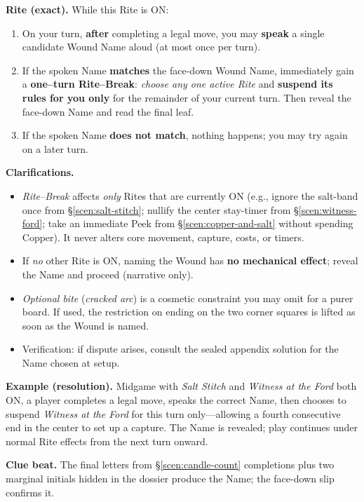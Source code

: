 \documentclass[11pt]{article}
\numberwithin{equation}{section} %
\theoremstyle{plain} %
\theoremstyle{definition} %
\theoremstyle{remark} %
\begin{document}
\medskip
\noindent\textbf{Rite (exact).} While this Rite is \textsc{ON}:
\begin{enumerate}\setlength\itemsep{0.2em}
  \item On your turn, \textbf{after} completing a legal move, you may \textbf{speak} a single candidate Wound Name aloud (at most once per turn).
  \item If the spoken Name \textbf{matches} the face-down Wound Name, immediately gain a \textbf{one–turn Rite–Break}: \emph{choose any one active Rite} and \textbf{suspend its rules for you only} for the remainder of your current turn. Then reveal the face-down Name and read the final leaf.
  \item If the spoken Name \textbf{does not match}, nothing happens; you may try again on a later turn.
\end{enumerate}

\medskip
\noindent\textbf{Clarifications.}
\begin{itemize}\setlength\itemsep{0.25em}
  \item \textit{Rite–Break} affects \emph{only} Rites that are currently \textsc{ON} (e.g., ignore the salt-band once from \S\ref{scen:salt-stitch}; nullify the center stay-timer from \S\ref{scen:witness-ford}; take an immediate Peek from \S\ref{scen:copper-and-salt} without spending Copper). It never alters core movement, capture, costs, or timers.
  \item If \emph{no} other Rite is \textsc{ON}, naming the Wound has \textbf{no mechanical effect}; reveal the Name and proceed (narrative only).
  \item \textit{Optional bite} (\emph{cracked arc}) is a cosmetic constraint you may omit for a purer board. If used, the restriction on ending on the two corner squares is lifted as soon as the Wound is named.
  \item Verification: if dispute arises, consult the sealed appendix solution for the Name chosen at setup.
\end{itemize}

\medskip
\noindent\textbf{Example (resolution).}  
Midgame with \emph{Salt Stitch} and \emph{Witness at the Ford} both \textsc{ON}, a player completes a legal move, speaks the correct Name, then chooses to suspend \emph{Witness at the Ford} for this turn only—allowing a fourth consecutive end in the center to set up a capture. The Name is revealed; play continues under normal Rite effects from the next turn onward.

\medskip
\noindent\textbf{Clue beat.} The final letters from \S\ref{scen:candle-count} completions plus two marginal initials hidden in the dossier produce the Name; the face-down slip confirms it.
\end{document}
